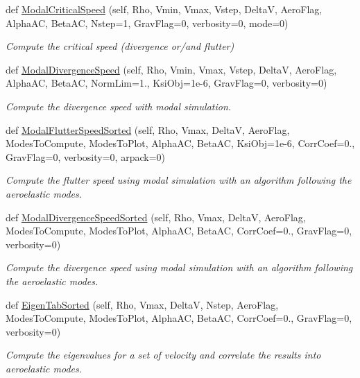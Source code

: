 \begin{DoxyCompactItemize}
def \hyperlink{classgebtaero_1_1_simulation_1_1_simulation_a9e1695e4fd6c14ac4c9ddcf488ba6b77}{Modal\+Critical\+Speed} (self, Rho, Vmin, Vmax, Vstep, DeltaV, Aero\+Flag, Alpha\+AC, Beta\+AC, Nstep=1, Grav\+Flag=0, verbosity=0, mode=0)
\begin{DoxyCompactList}\small\item\em Compute the critical speed (divergence or/and flutter) \end{DoxyCompactList}\item 
def \hyperlink{classgebtaero_1_1_simulation_1_1_simulation_ac3bea60a9f9d2c552125644a3256df88}{Modal\+Divergence\+Speed} (self, Rho, Vmin, Vmax, Vstep, DeltaV, Aero\+Flag, Alpha\+AC, Beta\+AC, Norm\+Lim=1., Ksi\+Obj=1e-\/6, Grav\+Flag=0, verbosity=0)
\begin{DoxyCompactList}\small\item\em Compute the divergence speed with modal simulation. \end{DoxyCompactList}\item 
def \hyperlink{classgebtaero_1_1_simulation_1_1_simulation_ae06bc82e983fb16d7f3e303046a39a2e}{Modal\+Flutter\+Speed\+Sorted} (self, Rho, Vmax, DeltaV, Aero\+Flag, Modes\+To\+Compute, Modes\+To\+Plot, Alpha\+AC, Beta\+AC, Ksi\+Obj=1e-\/6, Corr\+Coef=0., Grav\+Flag=0, verbosity=0, arpack=0)
\begin{DoxyCompactList}\small\item\em Compute the flutter speed using modal simulation with an algorithm following the aeroelastic modes. \end{DoxyCompactList}\item 
def \hyperlink{classgebtaero_1_1_simulation_1_1_simulation_a597d75e677892bd4308a6537a27eedb8}{Modal\+Divergence\+Speed\+Sorted} (self, Rho, Vmax, DeltaV, Aero\+Flag, Modes\+To\+Compute, Modes\+To\+Plot, Alpha\+AC, Beta\+AC, Corr\+Coef=0., Grav\+Flag=0, verbosity=0)
\begin{DoxyCompactList}\small\item\em Compute the divergence speed using modal simulation with an algorithm following the aeroelastic modes. \end{DoxyCompactList}\item 
def \hyperlink{classgebtaero_1_1_simulation_1_1_simulation_ae64bf3c9cef715d9d999acef888a840e}{Eigen\+Tab\+Sorted} (self, Rho, Vmax, DeltaV, Nstep, Aero\+Flag, Modes\+To\+Compute, Modes\+To\+Plot, Alpha\+AC, Beta\+AC, Corr\+Coef=0., Grav\+Flag=0, verbosity=0)
\begin{DoxyCompactList}\small\item\em Compute the eigenvalues for a set of velocity and correlate the results into aeroelastic modes. \end{DoxyCompactList}\item 

\end{DoxyCompactItemize}

